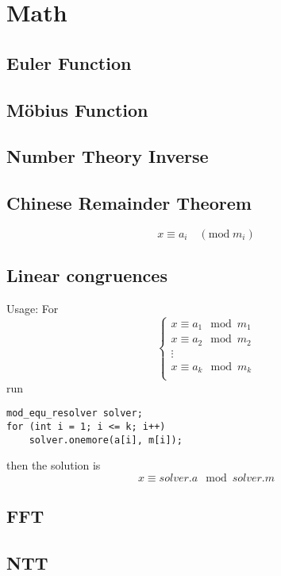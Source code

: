 \section{Math}

\subsection{Euler Function}


\subsection{Möbius Function}


\subsection{Number Theory Inverse}


\subsection{Chinese Remainder Theorem}
\[
	x \equiv a_i \quad (\mathrm{mod}\;m_i)
\]


\subsection{Linear congruences}

Usage:
For
\[
\left\{
    \begin{array}{l}
    x \equiv a_1 \mod m_1 \\
    x \equiv a_2 \mod m_2 \\
    \vdots \\
    x \equiv a_k \mod m_k \\
    \end{array}
\right.
\]
run
\begin{lstlisting}
mod_equ_resolver solver;
for (int i = 1; i <= k; i++)
    solver.onemore(a[i], m[i]);
\end{lstlisting}
then the solution is
\[
    x \equiv solver.a \mod solver.m
\]

\subsection{FFT}


\subsection{NTT}


